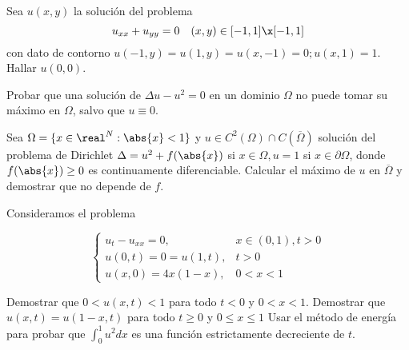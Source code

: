 \begin{problem}[9] Sea $ u(x,y) $ la solución del problema \[ u_{xx}+u_{yy}=0 \quad (x,y) \in [-1,1]\x[-1,1] \]
con dato de contorno $ u(-1,y)=u(1,y)=u(x,-1)=0; u(x,1)=1 $. Hallar $ u(0,0) $.

\solution

\end{problem}





\begin{problem}[10] Probar que una solución de $ \Delta u - u^2=0 $ en un dominio $ \Omega $ no puede tomar su máximo en $ \Omega $, salvo que $ u \equiv 0 $.

\solution

\end{problem}





\begin{problem}[11] Sea $ \Omega = \{ x\in\real^N  : \abs{x}<1 \} $ y $ u\in C^2(\Omega)\cap C(\overline{\Omega}) $ solución del problema de Dirichlet $ \Delta = u^2+f(\abs{x}) $ si $ x\in\Omega, u=1 $ si $ x\in \partial\Omega $, donde $ f(\abs{x})\geq 0 $ es continuamente diferenciable. Calcular el máximo de $ u $ en $ \overline{\Omega} $ y demostrar que no depende de $ f $.
	
\solution

\end{problem}





\begin{problem}[12] Consideramos el problema

\[\begin{cases}
u_t - u_{xx} = 0,      & x \in (0,1), t > 0\\
u(0,t) = 0 = u(1,t),    & t>0\\
u(x,0) = 4x(1-x),       & 0<x<1
\end{cases}\]

\ppart Demostrar que $ 0<u(x,t)<1 $ para todo $ t<0 $ y $ 0<x<1 $.
\ppart Demostrar que $ u(x,t)=u(1-x,t) $ para todo $ t \geq 0 $ y $ 0 \leq x \leq 1 $
\ppart Usar el método de energía para probar que $ \int_{0}^{1} u^2dx$ es una función estrictamente decreciente de $ t $.

\solution

\end{problem}





